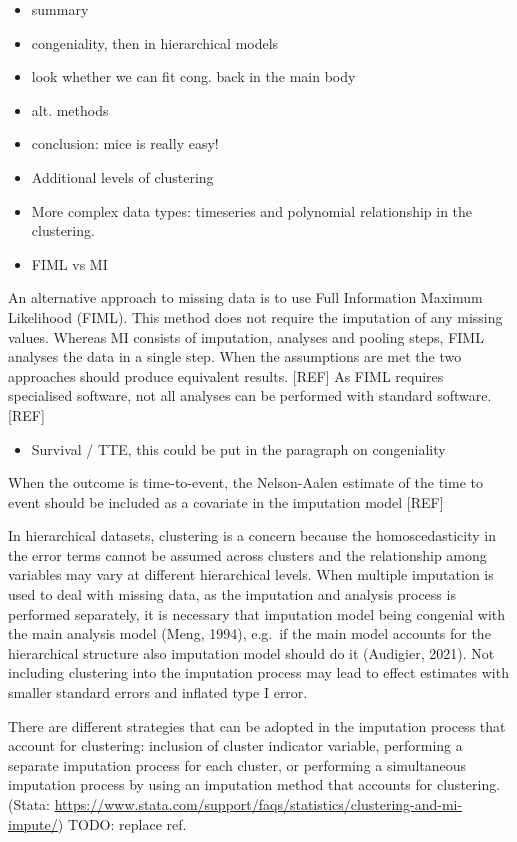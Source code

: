 \documentclass[
]{jss}
\providecommand{\tightlist}{%
  \setlength{\itemsep}{0pt}\setlength{\parskip}{0pt}}
\begin{document}
\begin{itemize}
\item
  summary
\item
  congeniality, then in hierarchical models
\item
  look whether we can fit cong. back in the main body
\item
  alt. methods
\item
  conclusion: mice is really easy!
\item
  Additional levels of clustering
\item
  More complex data types: timeseries and polynomial relationship in the
  clustering.
\item
  FIML vs MI
\end{itemize}

An alternative approach to missing data is to use Full Information
Maximum Likelihood (FIML). This method does not require the imputation
of any missing values. Whereas MI consists of imputation, analyses and
pooling steps, FIML analyses the data in a single step. When the
assumptions are met the two approaches should produce equivalent
results. {[}REF{]} As FIML requires specialised software, not all
analyses can be performed with standard software. {[}REF{]}

\begin{itemize}
\tightlist
\item
  Survival / TTE, this could be put in the paragraph on congeniality
\end{itemize}

When the outcome is time-to-event, the Nelson-Aalen estimate of the time
to event should be included as a covariate in the imputation model
{[}REF{]}

In hierarchical datasets, clustering is a concern because the
homoscedasticity in the error terms cannot be assumed across clusters
and the relationship among variables may vary at different hierarchical
levels. When multiple imputation is used to deal with missing data, as
the imputation and analysis process is performed separately, it is
necessary that imputation model being congenial with the main analysis
model (Meng, 1994), e.g.~if the main model accounts for the hierarchical
structure also imputation model should do it (Audigier, 2021). Not
including clustering into the imputation process may lead to effect
estimates with smaller standard errors and inflated type I error.

There are different strategies that can be adopted in the imputation
process that account for clustering: inclusion of cluster indicator
variable, performing a separate imputation process for each cluster, or
performing a simultaneous imputation process by using an imputation
method that accounts for clustering.(Stata:
\url{https://www.stata.com/support/faqs/statistics/clustering-and-mi-impute/})
TODO: replace ref.
\end{document}
